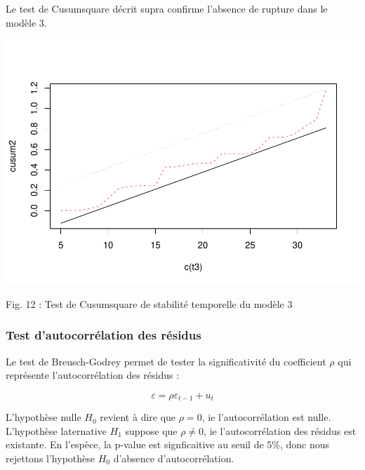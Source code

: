 \documentclass[
]{article}
\begin{document}
Le test de Cusumsquare décrit supra confirme l'absence de rupture dans
le modèle 3.

\includegraphics{Projet_econometrie_II_files/figure-latex/unnamed-chunk-14-1.pdf}

Fig. 12 : Test de Cusumsquare de stabilité temporelle du modèle 3

\hypertarget{test-dautocorruxe9lation-des-ruxe9sidus}{%
\subsubsection{Test d'autocorrélation des
résidus}\label{test-dautocorruxe9lation-des-ruxe9sidus}}

Le test de Breusch-Godrey permet de tester la significativité du
coefficient \(\rho\) qui représente l'autocorrélation des résidus :

\begin{equation}
    \label{eq:BG}
\varepsilon = \rho \varepsilon_{t-1} + u_t
\end{equation}

L'hypothèse nulle \(H_0\) revient à dire que \(\rho=0\), ie
l'autocorrélation est nulle. L'hypothèse laternative \(H_1\) suppose que
\(\rho \ne 0\), ie l'autocorrélation des résidus est existante. En
l'espèce, la p-value est signficaitive au seuil de 5\%, donc nous
rejettons l'hypothèse \(H_0\) d'absence d'autocorrélation.
\end{document}
